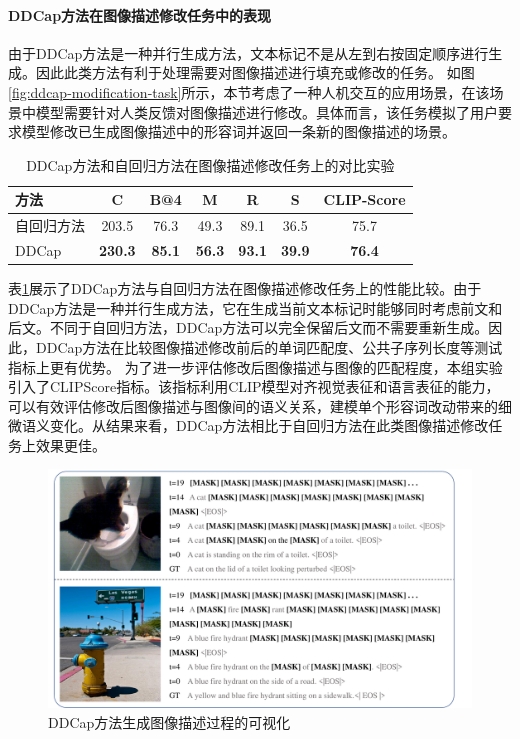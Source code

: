 \paragraph{DDCap方法在图像描述修改任务中的表现}
由于DDCap方法是一种并行生成方法，文本标记不是从左到右按固定顺序进行生成。因此此类方法有利于处理需要对图像描述进行填充或修改的任务。
如图\ref{fig:ddcap-modification-task}所示，本节考虑了一种人机交互的应用场景，在该场景中模型需要针对人类反馈对图像描述进行修改。具体而言，该任务模拟了用户要求模型修改已生成图像描述中的形容词并返回一条新的图像描述的场景。%

\begin{table}
  \centering
  \caption{DDCap方法和自回归方法在图像描述修改任务上的对比实验}
  \begin{tabular}{lcccccc}
    \toprule
    方法 & C & B@4 & M & R & S & CLIP-Score\\
    \midrule
    自回归方法 & 203.5 & 76.3  & 49.3 &89.1& 36.5 & 75.7\\
    DDCap & \textbf{230.3} & \textbf{85.1}  &  \textbf{56.3} & \textbf{93.1} & \textbf{39.9} & \textbf{76.4}\\
    \bottomrule
  \end{tabular}
  \label{tab:ddcap-infill}
\end{table}

表\ref{tab:ddcap-infill}展示了DDCap方法与自回归方法在图像描述修改任务上的性能比较。由于DDCap方法是一种并行生成方法，它在生成当前文本标记时能够同时考虑前文和后文。不同于自回归方法，DDCap方法可以完全保留后文而不需要重新生成。因此，DDCap方法在比较图像描述修改前后的单词匹配度、公共子序列长度等测试指标上更有优势。
为了进一步评估修改后图像描述与图像的匹配程度，本组实验引入了CLIPScore\cite{CLIPScore}指标。该指标利用CLIP模型对齐视觉表征和语言表征的能力，可以有效评估修改后图像描述与图像间的语义关系，建模单个形容词改动带来的细微语义变化。从结果来看，DDCap方法相比于自回归方法在此类图像描述修改任务上效果更佳。


\begin{figure}
  \centering
  \includegraphics[width=1.0\linewidth]{figures/ddcap-generate-order.pdf}
  \caption{DDCap方法生成图像描述过程的可视化}
  \label{fig:ddcap-generate-order}
\end{figure}

